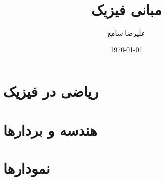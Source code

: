 \documentclass[a4paper,12pt]{book}
\author{علیرضا سامع}
\title{مبانی فیزیک}
\date{\today}
\begin{document}
	

	
	\frontmatter
	\maketitle
	\tableofcontents
	
	\mainmatter
\chapter{ریاضی در فیزیک}

\chapter{هندسه و بردارها}

\chapter{نمودارها}
	\backmatter
	
\end{document}

